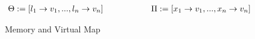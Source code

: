 \begin{figure}[H]
		\small
		\begin{minipage}[t]{.55\columnwidth}
			\[\begin{array}{@{}r@{\ \ }l@{\quad}l}
				\kheap := [l_1 \rightarrow v_1, ..., l_n \rightarrow v_n]
				\hspace{2cm} \kvm := [x_1 \rightarrow v_1, ..., x_n \rightarrow v_n]				
			\end{array}\]
		\end{minipage}%
		
	\caption{Memory and Virtual Map}\label{fig:memory-model}
\end{figure}



